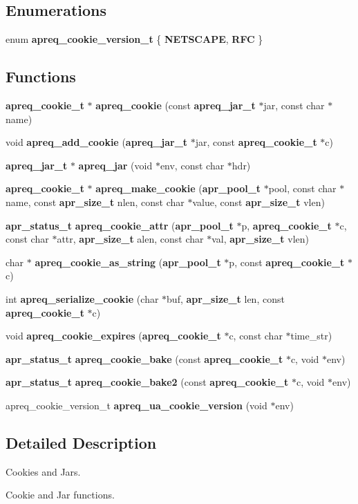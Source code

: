 \subsection*{Enumerations}
\begin{CompactItemize}
\item 
enum {\bf apreq\_\-cookie\_\-version\_\-t} \{ {\bf NETSCAPE}, 
{\bf RFC}
 \}
\end{CompactItemize}
\subsection*{Functions}
\begin{CompactItemize}
\item 
{\bf apreq\_\-cookie\_\-t} $\ast$ {\bf apreq\_\-cookie} (const {\bf apreq\_\-jar\_\-t} $\ast$jar, const char $\ast$name)
\item 
void {\bf apreq\_\-add\_\-cookie} ({\bf apreq\_\-jar\_\-t} $\ast$jar, const {\bf apreq\_\-cookie\_\-t} $\ast$c)
\item 
{\bf apreq\_\-jar\_\-t} $\ast$ {\bf apreq\_\-jar} (void $\ast$env, const char $\ast$hdr)
\item 
{\bf apreq\_\-cookie\_\-t} $\ast$ {\bf apreq\_\-make\_\-cookie} ({\bf apr\_\-pool\_\-t} $\ast$pool, const char $\ast$name, const {\bf apr\_\-size\_\-t} nlen, const char $\ast$value, const {\bf apr\_\-size\_\-t} vlen)
\item 
{\bf apr\_\-status\_\-t} {\bf apreq\_\-cookie\_\-attr} ({\bf apr\_\-pool\_\-t} $\ast$p, {\bf apreq\_\-cookie\_\-t} $\ast$c, const char $\ast$attr, {\bf apr\_\-size\_\-t} alen, const char $\ast$val, {\bf apr\_\-size\_\-t} vlen)
\item 
char $\ast$ {\bf apreq\_\-cookie\_\-as\_\-string} ({\bf apr\_\-pool\_\-t} $\ast$p, const {\bf apreq\_\-cookie\_\-t} $\ast$c)
\item 
int {\bf apreq\_\-serialize\_\-cookie} (char $\ast$buf, {\bf apr\_\-size\_\-t} len, const {\bf apreq\_\-cookie\_\-t} $\ast$c)
\item 
void {\bf apreq\_\-cookie\_\-expires} ({\bf apreq\_\-cookie\_\-t} $\ast$c, const char $\ast$time\_\-str)
\item 
{\bf apr\_\-status\_\-t} {\bf apreq\_\-cookie\_\-bake} (const {\bf apreq\_\-cookie\_\-t} $\ast$c, void $\ast$env)
\item 
{\bf apr\_\-status\_\-t} {\bf apreq\_\-cookie\_\-bake2} (const {\bf apreq\_\-cookie\_\-t} $\ast$c, void $\ast$env)
\item 
apreq\_\-cookie\_\-version\_\-t {\bf apreq\_\-ua\_\-cookie\_\-version} (void $\ast$env)\label{apreq__cookie_8h_a21}

\end{CompactItemize}


\subsection{Detailed Description}
Cookies and Jars.

Cookie and Jar functions.